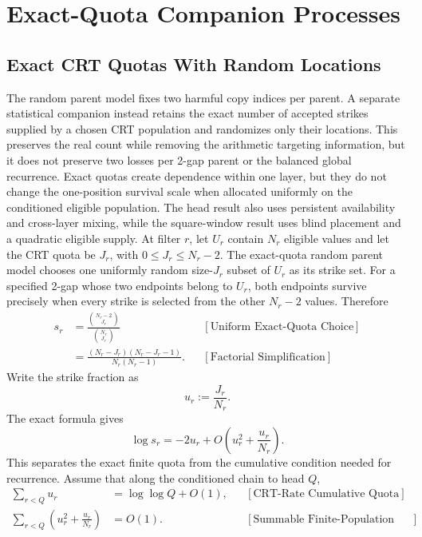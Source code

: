 \section{Exact-Quota Companion Processes}
\subsection{Exact CRT Quotas With Random Locations}
The random parent model fixes two harmful copy indices per parent. A separate statistical companion instead retains the exact number of accepted strikes supplied by a chosen CRT population and randomizes only their locations. This preserves the real count while removing the arithmetic targeting information, but it does not preserve two losses per 2-gap parent or the balanced global recurrence. Exact quotas create dependence within one layer, but they do not change the one-position survival scale when allocated uniformly on the conditioned eligible population. The head result also uses persistent availability and cross-layer mixing, while the square-window result uses blind placement and a quadratic eligible supply.
At filter $r$, let $U_r$ contain $N_r$ eligible values and let the CRT quota be $J_r$, with $0\le J_r\le N_r-2$. The exact-quota random parent model chooses one uniformly random size-$J_r$ subset of $U_r$ as its strike set. For a specified 2-gap whose two endpoints belong to $U_r$, both endpoints survive precisely when every strike is selected from the other $N_r-2$ values. Therefore
\begin{equation*}
\begin{aligned}
s_r
&=\frac{\binom{N_r-2}{J_r}}{\binom{N_r}{J_r}}
&&[\text{Uniform Exact-Quota Choice}]\\
&=\frac{(N_r-J_r)(N_r-J_r-1)}{N_r(N_r-1)}.
&&[\text{Factorial Simplification}]
\end{aligned}
\end{equation*}
Write the strike fraction as
\begin{equation*}
u_r:=\frac{J_r}{N_r}.
\end{equation*}
The exact formula gives
\begin{equation*}
\log s_r
=-2u_r+O\left(u_r^2+\frac{u_r}{N_r}\right).
\end{equation*}
This separates the exact finite quota from the cumulative condition needed for recurrence. Assume that along the conditioned chain to head $Q$,
\begin{equation*}
\begin{aligned}
\sum_{r < Q}u_r
&=\log\log Q+O(1),
&&[\text{CRT-Rate Cumulative Quota}]\\
\sum_{r < Q}
\left(u_r^2+\frac{u_r}{N_r}\right)
&=O(1).
&&[\text{Summable Finite-Population Error}]
\end{aligned}
\end{equation*}
